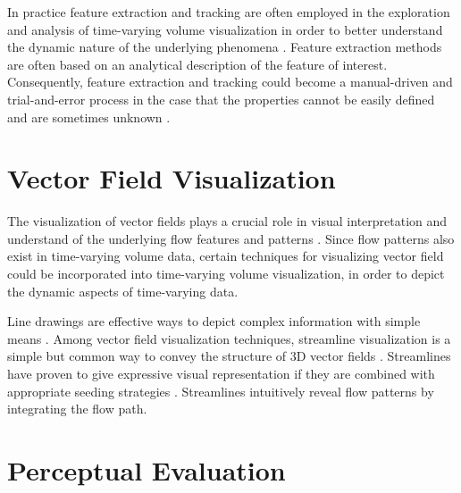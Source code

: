 In practice feature extraction and tracking are often employed in the exploration and analysis of time-varying volume visualization in order to better understand the dynamic nature of the underlying phenomena \cite{tzeng_intelligent_2005} \cite{woodring_multiscale_2009} \cite{lee_visualizing_2009} \cite{gu_transgraph_2011}.
Feature extraction methods are often based on an analytical description of the feature of interest. Consequently, feature extraction and tracking could become a manual-driven and trial-and-error process in the case that the properties cannot be easily defined and are sometimes unknown \cite{ma_machine_2007}.

%
%

\section{Vector Field Visualization}
The visualization of vector fields plays a crucial role in visual interpretation and understand of the underlying flow features and patterns \cite{kuhn_clustering-based_2011} \cite{ma_coherent_2013}. Since flow patterns also exist in time-varying volume data, certain techniques for visualizing vector field could be incorporated into time-varying volume visualization, in order to depict the dynamic aspects of time-varying data.

Line drawings are effective ways to depict complex information with simple means \cite{benard_state_art_2011}. Among vector field visualization techniques, streamline visualization is a simple but common way to convey the structure of 3D vector fields \cite{chen_illustrative_2011}. Streamlines have proven to give expressive visual representation if they are combined with appropriate seeding strategies \cite{annen_vector_2008}. Streamlines intuitively reveal flow patterns by integrating the flow path.

\section{Perceptual Evaluation}

